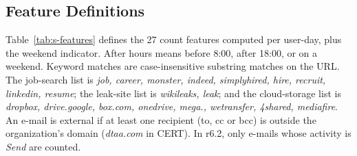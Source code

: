\documentclass[10pt,onecolumn,letterpaper]{article}
\begin{document}
\subsection{Feature Definitions}
Table~\ref{tab:s-features} defines the 27 count features computed per user-day, plus the weekend indicator. After hours means before 8:00, after 18:00, or on a weekend. Keyword matches are case-insensitive substring matches on the URL. The job-search list is \textit{job, career, monster, indeed, simplyhired, hire, recruit, linkedin, resume}; the leak-site list is \textit{wikileaks, leak}; and the cloud-storage list is \textit{dropbox, drive.google, box.com, onedrive, mega., wetransfer, 4shared, mediafire}. An e-mail is external if at least one recipient (to, cc or bcc) is outside the organization's domain (\textit{dtaa.com} in CERT). In r6.2, only e-mails whose activity is \textit{Send} are counted.
\end{document}
